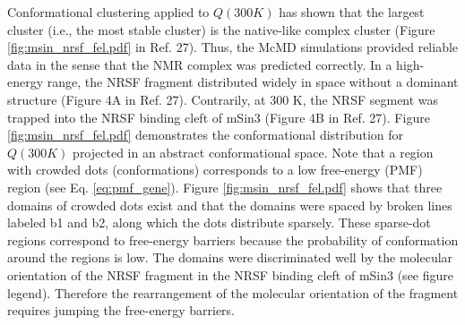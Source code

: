 Conformational clustering applied to $Q(300 K)$ has shown that the largest cluster (i.e., the most stable cluster) is the native-like complex cluster (Figure \ref{fig:msin_nrsf_fel.pdf} in Ref. 27). Thus, the McMD simulations provided reliable data in the sense that the NMR complex was predicted correctly. In a high-energy range, the NRSF fragment distributed widely in space without a dominant structure (Figure 4A in Ref. 27). Contrarily, at 300 K, the NRSF segment was trapped into the NRSF binding cleft of mSin3 (Figure 4B in Ref. 27). Figure \ref{fig:msin_nrsf_fel.pdf} demonstrates the conformational distribution for $Q(300 K)$ projected in an abstract conformational space. Note that a region with crowded dots (conformations) corresponds to a low free-energy (PMF) region (see Eq. \ref{eq:pmf_gene}). Figure \ref{fig:msin_nrsf_fel.pdf} shows that three domains of crowded dots exist and that the domains were spaced by broken lines labeled b1 and b2, along which the dots distribute sparsely. These sparse-dot regions correspond to free-energy barriers because the probability of conformation around the regions is low. The domains were discriminated well by the molecular orientation of the NRSF fragment in the NRSF binding cleft of mSin3 (see figure legend). Therefore the rearrangement of the molecular orientation of the fragment requires jumping the free-energy barriers. 

